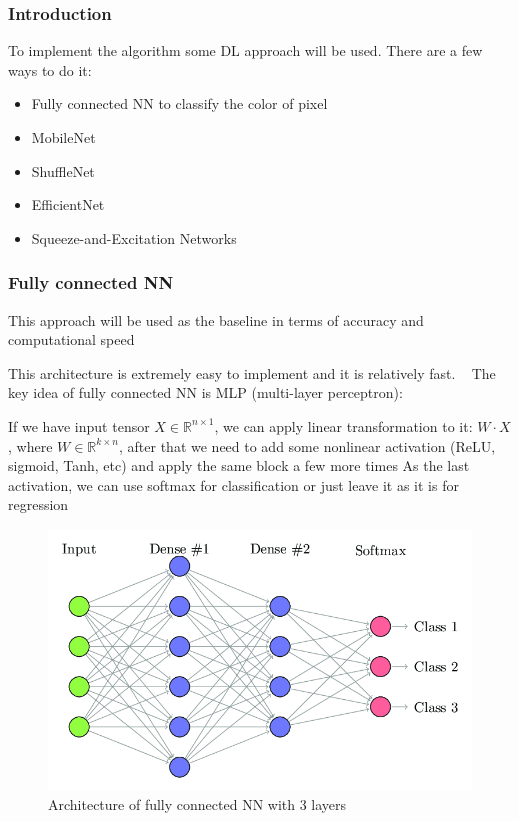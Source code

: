 \subsubsection{Introduction}
To implement the algorithm some DL approach will be used. 
There are a few ways to do it:
\begin{itemize}
    \item Fully connected NN to classify the color of pixel\cite{fully_connected} 
    \item MobileNet\cite{mobileNet}
    \item ShuffleNet\cite{shufflenet}
    \item EfficientNet\cite{efficientnet}
    \item Squeeze-and-Excitation Networks\cite{seNet}
\end{itemize}
\subsubsection{Fully connected NN}
This approach will be used as the baseline in terms of accuracy and computational 
speed

This architecture is extremely easy to implement and it is relatively fast.
~\cite{fully_connected} 
The key idea of fully connected NN is MLP (multi-layer perceptron):

If we have input tensor $X\in \mathbb{R}^{n\times 1}$, we can apply linear transformation to it:
$W\cdot X$, where $W \in \mathbb{R}^{k\times n}$, after that we need to add some 
nonlinear activation (ReLU, sigmoid, Tanh, etc) and apply the same block a few more times
As the last activation, we can use softmax for classification or just leave it as it is for regression

\begin{figure}[ht]
    \includegraphics[scale=0.5]{src/BackgroundReading/assets/fully_connected.png}
    \caption{Architecture of fully connected NN with 3 layers}
\end{figure}


